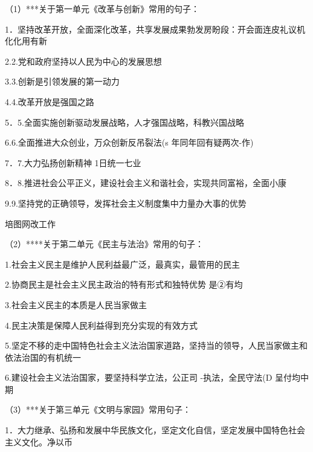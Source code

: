\documentclass[lang=cn,11pt]{elegantbook}
\newcommand{\daofasym}[1]{{\daofasymbolfont #1}}
\newcommand{\daofasym}[1]{#1}
\begin{document}
（1）***关于第一单元《改革与创新》常用的句子：\par

1．坚持改革开放，全面深化改革，共享发展成果勃发房盼段：开会面连皮礼议机化化用有新\par

2.2.党和政府坚持以人民为中心的发展思想\par

3.3.创新是引领发展的第一动力\par

4.4.改革开放是强国之路\par

5．5.全面实施创新驱动发展战略，人才强国战略，科教兴国战略\par

6.6.全面推进大众创业，万众创新反吊裂法(s 年同年回有疑两次-作)\par

7．7.大力弘扬创新精神 1日统一七业\par

8．8.推进社会公平正义，建设社会主义和谐社会，实现共同富裕，全面小康\par

9.9.坚持党的正确领导，发挥社会主义制度集中力量办大事的优势\par

培图网改工作\par

（2）****关于第二单元《民主与法治》常用的句子：\par

1.社会主义民主是维护人民利益最广泛，最真实，最管用的民主\par

2.协商民主是社会主义民主政治的特有形式和独特优势 是\daofasym{②}有均\par

3.社会主义民主的本质是人民当家做主\par

4.民主决策是保障人民利益得到充分实现的有效方式\par

5.坚定不移的走中国特色社会主义法治国家道路，坚持当的领导，人民当家做主和依法治国的有机统一\par

6.建设社会主义法治国家，要坚持科学立法，公正司 -执法，全民守法(D 呈付均中期\par

（3）***关于第三单元《文明与家园》常用句子：\par

1．大力继承、弘扬和发展中华民族文化，坚定文化自信，坚定发展中国特色社会主义文化。净以币\par
\end{document}
